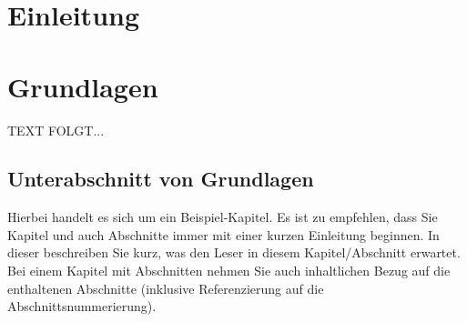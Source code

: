 \documentclass[a4paper,12pt,oneside]{article}
\begin{document}
  \pagestyle{empty} %
  \newpage %
  
  
  
  
  
  \newpage
  
  \tableofcontents
  
  \newpage
  \pagestyle{fancy} %
 
  
  
  \newpage
  
  \newpage
  
  \section{Einleitung}\label{kap_einleitung}  
   
   
  \newpage  
  \section{Grundlagen}\label{kap_grundlagen}  
    TEXT FOLGT...
   
    \subsection{Unterabschnitt von Grundlagen}\label{subsec_UabsGrundl}
     
    Hierbei \autocite{einstein} handelt es sich um ein Beispiel-Kapitel. Es ist zu empfehlen, dass Sie Kapitel und auch Abschnitte immer mit\autocite{SW11} einer kurzen Einleitung beginnen. In dieser beschreiben Sie kurz\autocite[125]{einstein}, was den Leser in diesem Kapitel/Abschnitt erwartet. Bei\autocite{SW11} einem Kapitel mit Abschnitten nehmen Sie auch inhaltlichen Bezug auf die enthaltenen Abschnitte (inklusive\autocite{SW11} Referenzierung auf die Abschnittsnummerierung).
      
\end{document}
